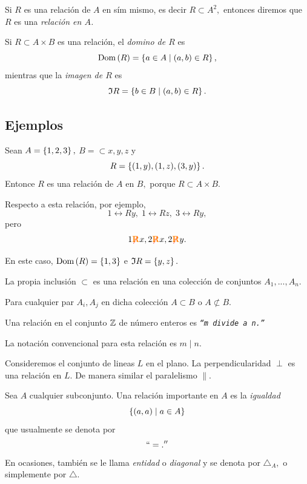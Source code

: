 	Si $R$ es una relaci\'on de $A$ en s\'im mismo, es decir $R \subset A^{2},$ entonces diremos que $R$ es una \emph{relaci\'on en $A$.}



	\begin{defn}
		Si $R \subset A \times B$ es una relaci\'on, el \emph{domino de $R$} es 
		$$
		\operatorname{Dom}\left( R \right)=\left\{ a\in A\mid (a,b)\in R \right\},
		$$ mientras que la \emph{imagen de $R$} es 
		$$
		\mathfrak{I}{R}=\left\{ b\in B\mid (a,b)\in R \right\}.
		$$
	\end{defn}
	


\subsection{Ejemplos}

	Sean $A=\left\{ 1,2,3 \right\},$ $B=\subset{x,y,z}$ y $$R=\left\{ (1,y), (1,z), (3,y) \right\}.$$ Entonce $R$ es una relaci\'on de $A$ en $B,$ porque $R \subset A \times B.$
	
	
	Respecto a esta relaci\'on, por ejemplo,
	$$
	1\rel{R}y, \; 1\rel{R}z, \; 3\rel{R}y,
	$$ pero 
	$$
	1{ {\color{red}\not}{\color{orange}\textbf{R}} }x, 2{ {\color{red}\not}{\color{orange}\textbf{R}} }x, 2{ {\color{red}\not}{\color{orange}\textbf{R}} }y.
	$$
	
	
	En este caso, $\operatorname{Dom}\left( R \right)=\left\{ 1,3 \right\}$ e $\mathfrak{I}{R}=\left\{ y,z \right\}.$



	La propia inclusi\'on $\subset$ es una relaci\'on en una colecci\'on de conjuntos $A_{1},...,A_{n}.$ 
	
	Para cualquier par $A_{i}, A_{j}$ en dicha colecci\'on $A \subset B$ o $A \not\subset B.$



	Una relaci\'on en el conjunto $\mathbb{Z}$ de n\'umero enteros es \emph{\texttt{``$m$ divide a $n.$''}}
	
	
	La notaci\'on convencional para esta relaci\'on es \emph{$m \mid n.$}



	Consideremos el conjunto de lineas $L$ en el plano. La perpendicularidad $\perp$ es una relaci\'on en $L.$  De manera similar el paralelismo $\parallel.$



	Sea $A$ cualquier subconjunto. Una relaci\'on importante en $A$ es la \emph{igualdad}
	$$
	\left\{ (a,a) \mid a \in A \right\}
	$$ que usualmente se denota por \emph{$$``=.''$$} 
	 En ocasiones, tambi\'en se le llama \emph{entidad} o \emph{diagonal} y se denota por $\triangle_{A},$ o simplemente por $\triangle.$



